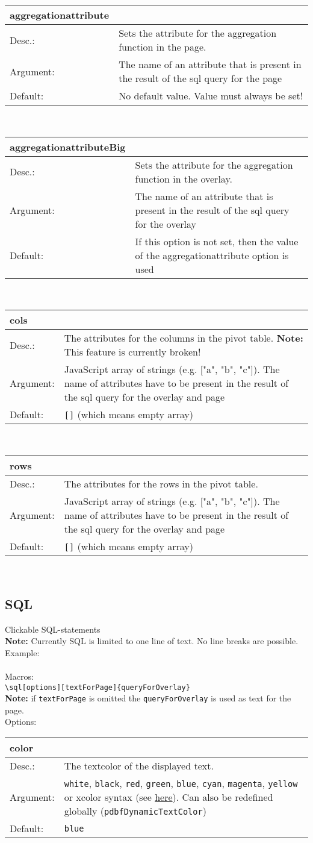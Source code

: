 \documentclass[11pt]{article}
\def\a{5cm}
\def\b{10.5cm}
\def\option#1#2#3#4{%
\noindent \begin{tabular}{|p{\a}|p{\b}|}
\hline
\textbf{#1} & \\
\hline
Desc.: & #2 \\
\hline
Argument: & #3\\
\hline
Default:& #4\\
\hline
\end{tabular} \\[4pt]%
}
\begin{document}
\option
{aggregationattribute}
{Sets the attribute for the aggregation function in the page.}
{The name of an attribute that is present in the result of the sql query for the page}
{No default value. Value must always be set!}

\option
{aggregationattributeBig}
{Sets the attribute for the aggregation function in the overlay.}
{The name of an attribute that is present in the result of the sql query for the overlay}
{If this option is not set, then the value of the aggregationattribute option is used}

\option
{cols}
{The attributes for the columns in the pivot table. \textbf{Note:} This feature is currently broken!}
{JavaScript array of strings (e.g. ["a", "b", "c"]). The name of attributes have to be present in the result of the sql query for the overlay and page}
{\texttt{[]} (which means empty array)}

\option
{rows}
{The attributes for the rows in the pivot table.}
{JavaScript array of strings (e.g. ["a", "b", "c"]). The name of attributes have to be present in the result of the sql query for the overlay and page}
{\texttt{[]} (which means empty array)}

\subsection{SQL}
Clickable SQL-statements\\[3pt]
\textbf{Note:} Currently SQL is limited to one line of text. No line breaks are possible.\\
Example:\\[3pt]
\\[3pt]
%
\noindent Macros: \\[3pt]
\verb|\sql[options][textForPage]{queryForOverlay}| \\
\textbf{Note:} if \verb|textForPage| is omitted the \verb|queryForOverlay| is used as text for the page.\\[8pt]

\noindent Options: \\[3pt]

\option
{color}
{The textcolor of the displayed text.}
{\texttt{white}, \texttt{black}, \texttt{red}, \texttt{green}, \texttt{blue}, \texttt{cyan}, \texttt{magenta}, \texttt{yellow} or xcolor syntax (see \href{http://mirror.unicorncloud.org/CTAN/macros/latex/contrib/xcolor/xcolor.pdf}{here}). Can also be redefined globally (\texttt{pdbfDynamicTextColor})}
{\texttt{blue}}
\end{document}
